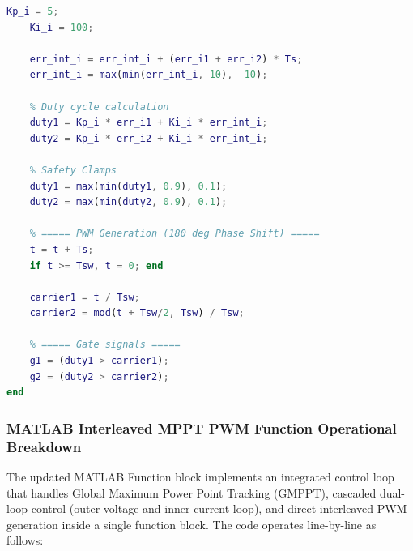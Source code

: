 \begin{lstlisting}[language=Matlab, caption={MATLAB code implementing the FSM-based global MPPT control loop.}]
    Kp_i = 5; 
    Ki_i = 100;
    
    err_int_i = err_int_i + (err_i1 + err_i2) * Ts; 
    err_int_i = max(min(err_int_i, 10), -10);
    
    % Duty cycle calculation
    duty1 = Kp_i * err_i1 + Ki_i * err_int_i;
    duty2 = Kp_i * err_i2 + Ki_i * err_int_i;
    
    % Safety Clamps
    duty1 = max(min(duty1, 0.9), 0.1);
    duty2 = max(min(duty2, 0.9), 0.1);
    
    % ===== PWM Generation (180 deg Phase Shift) =====
    t = t + Ts;
    if t >= Tsw, t = 0; end 
    
    carrier1 = t / Tsw;
    carrier2 = mod(t + Tsw/2, Tsw) / Tsw;
    
    % ===== Gate signals =====
    g1 = (duty1 > carrier1);
    g2 = (duty2 > carrier2);
end
\end{lstlisting}


\subsubsection{MATLAB Interleaved MPPT PWM Function Operational Breakdown}
The updated MATLAB Function block implements an integrated control loop that handles Global Maximum Power Point Tracking (GMPPT), cascaded dual-loop control (outer voltage and inner current loop), and direct interleaved PWM generation inside a single function block. The code operates line-by-line as follows:

